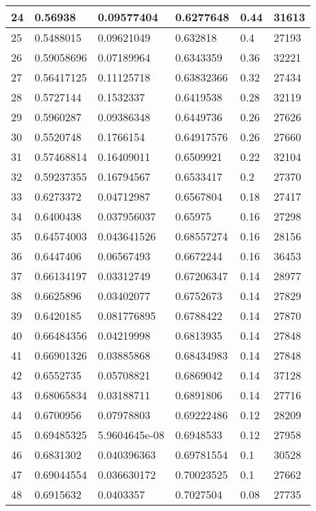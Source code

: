 \begin{longtable}{|l|l|l|l|l|l|}
24 & 0.56938 & 0.09577404 & 0.6277648 & 0.44 & 31613 \\ \hline 
25 & 0.5488015 & 0.09621049 & 0.632818 & 0.4 & 27193 \\ \hline 
26 & 0.59058696 & 0.07189964 & 0.6343359 & 0.36 & 32221 \\ \hline 
27 & 0.56417125 & 0.11125718 & 0.63832366 & 0.32 & 27434 \\ \hline 
28 & 0.5727144 & 0.1532337 & 0.6419538 & 0.28 & 32119 \\ \hline 
29 & 0.5960287 & 0.09386348 & 0.6449736 & 0.26 & 27626 \\ \hline 
30 & 0.5520748 & 0.1766154 & 0.64917576 & 0.26 & 27660 \\ \hline 
31 & 0.57468814 & 0.16409011 & 0.6509921 & 0.22 & 32104 \\ \hline 
32 & 0.59237355 & 0.16794567 & 0.6533417 & 0.2 & 27370 \\ \hline 
33 & 0.6273372 & 0.04712987 & 0.6567804 & 0.18 & 27417 \\ \hline 
34 & 0.6400438 & 0.037956037 & 0.65975 & 0.16 & 27298 \\ \hline 
35 & 0.64574003 & 0.043641526 & 0.68557274 & 0.16 & 28156 \\ \hline 
36 & 0.6447406 & 0.06567493 & 0.6672244 & 0.16 & 36453 \\ \hline 
37 & 0.66134197 & 0.03312749 & 0.67206347 & 0.14 & 28977 \\ \hline 
38 & 0.6625896 & 0.03402077 & 0.6752673 & 0.14 & 27829 \\ \hline 
39 & 0.6420185 & 0.081776895 & 0.6788422 & 0.14 & 27870 \\ \hline 
40 & 0.66484356 & 0.04219998 & 0.6813935 & 0.14 & 27848 \\ \hline 
41 & 0.66901326 & 0.03885868 & 0.68434983 & 0.14 & 27848 \\ \hline 
42 & 0.6552735 & 0.05708821 & 0.6869042 & 0.14 & 37128 \\ \hline 
43 & 0.68065834 & 0.03188711 & 0.6891806 & 0.14 & 27716 \\ \hline 
44 & 0.6700956 & 0.07978803 & 0.69222486 & 0.12 & 28209 \\ \hline 
45 & 0.69485325 & 5.9604645e-08 & 0.6948533 & 0.12 & 27958 \\ \hline 
46 & 0.6831302 & 0.040396363 & 0.69781554 & 0.1 & 30528 \\ \hline 
47 & 0.69044554 & 0.036630172 & 0.70023525 & 0.1 & 27662 \\ \hline 
48 & 0.6915632 & 0.0403357 & 0.7027504 & 0.08 & 27735 \\ \hline 

\end{longtable}
